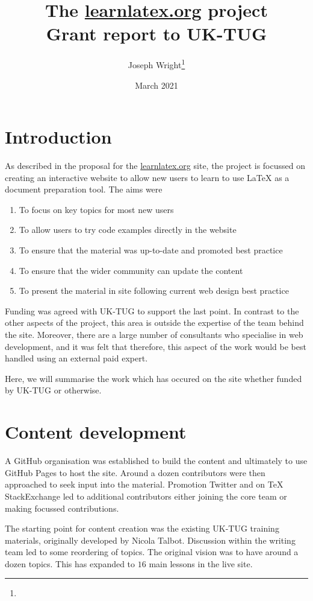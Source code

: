 \documentclass[a4paper]{article}
\author{Joseph Wright\thanks{\email{joseph.wright@morningstar2.co.uk}}}
\date{March 2021}
\title{The \url{learnlatex.org} project\\Grant report to UK-TUG}
\begin{document}
\maketitle

\section{Introduction}

As described in the proposal for the \url{learnlatex.org} site, the project is
focussed on creating an interactive website to allow new users to learn to use
\LaTeX{} as a document preparation tool. The aims were
\begin{enumerate}
  \item To focus on key topics for most new users
  \item To allow users to try code examples directly in the website
  \item To ensure that the material was up-to-date and promoted
    best practice
  \item To ensure that the wider community can update the content
  \item To present the material in site following current web design
    best practice
\end{enumerate}

Funding was agreed with UK-TUG to support the last point. In contrast to the
other aspects of the project, this area is outside the expertise of the team
behind the site. Moreover, there are a large number of consultants who
specialise in web development, and it was felt that therefore, this aspect of
the work would be best handled using an external paid expert.

Here, we will summarise the work which has occured on the site whether funded
by UK-TUG or otherwise.

\section{Content development}

A GitHub organisation was established to build the content and ultimately to
use GitHub Pages to host the site. Around a dozen contributors were then
approached to seek input into the material. Promotion  Twitter and
on TeX StackExchange led to additional contributors either joining the core
team or making focussed contributions.

The starting point for content creation was the existing UK-TUG training
materials, originally developed by Nicola Talbot. Discussion within the writing
team led to some reordering of topics. The original vision was to have around a
dozen topics. This has expanded to $16$ main lessons in the live site.
\end{document}
